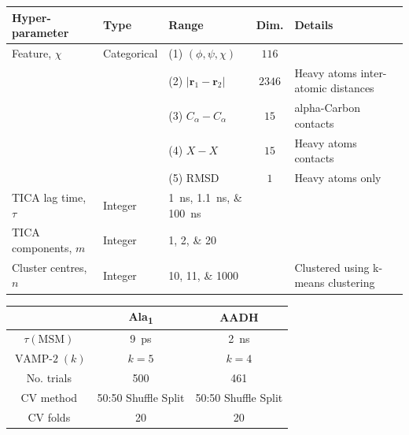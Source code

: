 \begin{table}
    \centering
    \begin{tabularx}{0.9\textwidth}{ |>{\raggedright\arraybackslash}l|l|>{\raggedright\arraybackslash}X|c| >{\raggedright\arraybackslash}X | } 
    \hline
    \textbf{Hyper-parameter} & \textbf{Type} & \textbf{Range} & \textbf{Dim.} &\textbf{Details} \\
     \hline\hline
    Feature, $\chi$ & Categorical & (1) $(\phi, \psi, \chi)$ & $\num{116}$  & \\
    & & (2) $|\mathbf{r}_{1}-\mathbf{r}_{2}|$  & $\num{ 2346}$& Heavy atoms inter-atomic distances \\
    & & (3) $C_{\alpha}-C_{\alpha}$ & $\num{15}$ & alpha-Carbon contacts\\ 
    & & (4) $X-X$  & $\num{15}$ & Heavy atoms contacts\\ 
    & & (5) RMSD & $\num{1}$ &  Heavy atoms only\\ 
    \hline
    TICA lag time, $\tau$ & Integer &\SIlist[list-final-separator = { ... }]{1;1.1;100}{ns} &  & \\
    \hline
    TICA components, $m$& Integer &\numlist[list-final-separator = { ... }]{1;2;20} & & \\
    \hline
    Cluster centres, $n$ & Integer & \numlist[list-final-separator = { ... }]{10;11;1000}& &  Clustered using k-means clustering  \\
    
     \hline
    \end{tabularx}
    \label{tab:aadh_searchspace}
\end{table}

\begin{table}
    \centering
    \begin{tabular}{|c|c|c|}
    \hline
    & Ala\textsubscript{1} & AADH \\
    \hline\hline
    $\tau(\mathrm{MSM})$ & \SI{9}{\pico\second} & \SI{2}{\nano\second} \\         
    $\operatorname{VAMP-2}(k)$ & $k=5$ & $k=4$ \\
    No. trials & 500 & 461 \\
    CV method & 50:50 Shuffle Split & 50:50 Shuffle Split \\
    CV folds & 20 & 20 \\
     \hline       
    \end{tabular}
    \label{tab:trial_specs}
\end{table}

